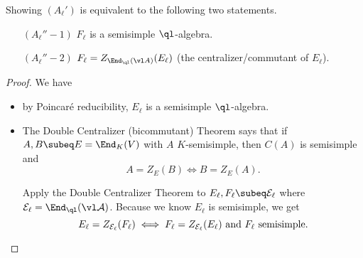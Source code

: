 Showing $(A_{\ell}')$ is equivalent to the following two statements.
\begin{enumerate}
\item[$(A_{\ell}''-1)$] $F_{\ell}$ is a semisimple $\ql$-algebra.
\item[$(A_{\ell}''-2)$] $F_{\ell}=Z_{\End_{\ql}(\vl A)}(E_{\ell})$ (the centralizer/commutant of $E_{\ell}$).
\end{enumerate}
\begin{proof}
We have
\begin{itemize}
\item
by Poincar\'e reducibility, $E_{\ell}$ is a semisimple $\ql$-algebra.
\item
The Double Centralizer (bicommutant) Theorem says that if $A,B\subeq E=\End_K(V)$ with $A$ $K$-semisimple, then $C(A)$ is semisimple and
\[
A=Z_E(B)\iff B=Z_E(A).
\]

Apply the Double Centralizer Theorem to $E_{\ell},F_{\ell}\subeq \cal E_{\ell}$ where $\cal E_{\ell}=\End_{\ql}(\vl A)$. Because we know $E_{\ell}$ is semisimple, we get 
\[
E_{\ell}=Z_{{\cal E}_{\ell}}(F_{\ell})\iff F_{\ell}=Z_{\cal E_{\ell}}(E_{\ell})\text{ and }F_{\ell}\text{ semisimple.}
\]
\end{itemize}
\end{proof}
